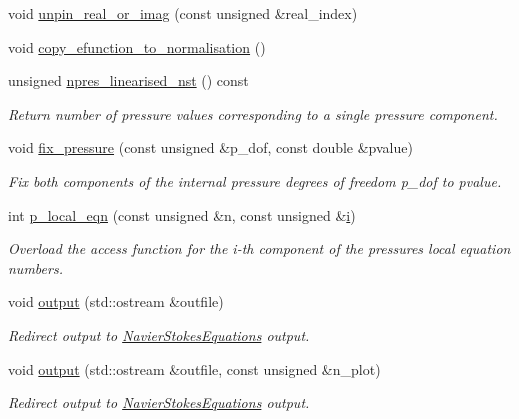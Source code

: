 \begin{DoxyCompactItemize}
void \hyperlink{classoomph_1_1LinearisedQCrouzeixRaviartElement_aedc60242b651d0b81350880ac6c5d603}{unpin\+\_\+real\+\_\+or\+\_\+imag} (const unsigned \&real\+\_\+index)
\item 
void \hyperlink{classoomph_1_1LinearisedQCrouzeixRaviartElement_a7fc159ace6ce53cd306ad67ac5ede353}{copy\+\_\+efunction\+\_\+to\+\_\+normalisation} ()
\item 
unsigned \hyperlink{classoomph_1_1LinearisedQCrouzeixRaviartElement_abf9a73af7823990fc95fd6bea9ecaca4}{npres\+\_\+linearised\+\_\+nst} () const
\begin{DoxyCompactList}\small\item\em Return number of pressure values corresponding to a single pressure component. \end{DoxyCompactList}\item 
void \hyperlink{classoomph_1_1LinearisedQCrouzeixRaviartElement_a0a928fd05a669269db7d3d064a072a7b}{fix\+\_\+pressure} (const unsigned \&p\+\_\+dof, const double \&pvalue)
\begin{DoxyCompactList}\small\item\em Fix both components of the internal pressure degrees of freedom p\+\_\+dof to pvalue. \end{DoxyCompactList}\item 
int \hyperlink{classoomph_1_1LinearisedQCrouzeixRaviartElement_adbf9ce1437bfaca4c7833713b2899706}{p\+\_\+local\+\_\+eqn} (const unsigned \&n, const unsigned \&\hyperlink{cfortran_8h_adb50e893b86b3e55e751a42eab3cba82}{i})
\begin{DoxyCompactList}\small\item\em Overload the access function for the i-\/th component of the pressure\textquotesingle{}s local equation numbers. \end{DoxyCompactList}\item 
void \hyperlink{classoomph_1_1LinearisedQCrouzeixRaviartElement_a160a7f873347a58ca86ee24a68725e27}{output} (std\+::ostream \&outfile)
\begin{DoxyCompactList}\small\item\em Redirect output to \hyperlink{classoomph_1_1NavierStokesEquations}{Navier\+Stokes\+Equations} output. \end{DoxyCompactList}\item 
void \hyperlink{classoomph_1_1LinearisedQCrouzeixRaviartElement_adc35ea04b68f963b4a17f206c89bae25}{output} (std\+::ostream \&outfile, const unsigned \&n\+\_\+plot)
\begin{DoxyCompactList}\small\item\em Redirect output to \hyperlink{classoomph_1_1NavierStokesEquations}{Navier\+Stokes\+Equations} output. \end{DoxyCompactList}\item 

\end{DoxyCompactItemize}
